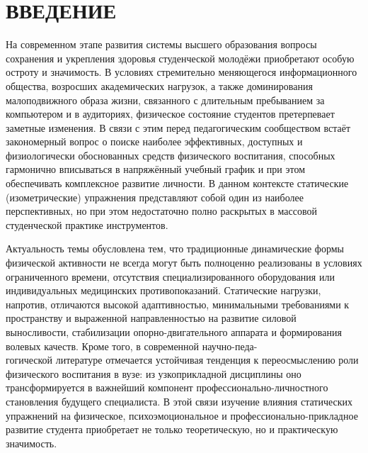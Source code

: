 \documentclass[oneside,a4paper,14pt]{extarticle}
\begin{document}


\newpage

\section*{ВВЕДЕНИЕ}

На современном этапе развития системы высшего образования вопросы сохранения и укрепления здоровья студенческой молодёжи приобретают особую остроту и значимость. В условиях стремительно меняющегося информационного общества, возросших академических нагрузок, а также доминирования малоподвижного образа жизни, связанного с длительным пребыванием за компьютером и в аудиториях, физическое состояние студентов претерпевает заметные изменения. В связи с этим перед педагогическим сообществом встаёт закономерный вопрос о поиске наиболее эффективных, доступных и физиологически обоснованных средств физического воспитания, способных гармонично вписываться в напряжённый учебный график и при этом обеспечивать комплексное развитие личности. В данном контексте статические (изометрические) упражнения представляют собой один из наиболее перспективных, но при этом недостаточно полно раскрытых в массовой студенческой практике инструментов.

Актуальность темы обусловлена тем, что традиционные динамические формы физической активности не всегда могут быть полноценно реализованы в условиях ограниченного времени, отсутствия специализированного оборудования или индивидуальных медицинских противопоказаний. Статические нагрузки, напротив, отличаются высокой адаптивностью, минимальными требованиями к пространству и выраженной направленностью на развитие силовой выносливости, стабилизации опорно-двигательного аппарата и формирования волевых качеств. Кроме того, в современной  научно-педа-\\гогической литературе отмечается устойчивая тенденция к переосмыслению роли физического воспитания в вузе: из узкоприкладной дисциплины оно трансформируется в важнейший компонент профессионально-личностного становления будущего специалиста. В этой связи изучение влияния статических упражнений на физическое, психоэмоциональное и профессионально-прикладное развитие студента приобретает не только теоретическую, но и практическую значимость.
\end{document}
